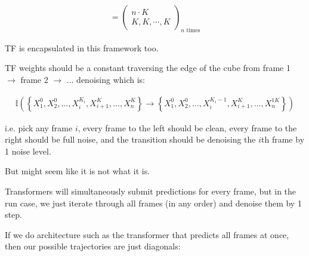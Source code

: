 \documentclass[11pt]{article}
\begin{document}
\begin{align}
= \begin{pmatrix}
n \cdot K \\
K, K, \cdots, K
\end{pmatrix}_{n \text{ times}}
\end{align}

TF is encapsulated in this framework too.

TF weights should be a constant traversing the edge of the cube from frame 1 $\rightarrow$ frame 2 $\rightarrow$ ... denoising which is:

\begin{align}
\mathbb{I}\left( \left\{ X_1^0, X_2^0, \ldots, X_i^{K_i}, X_{i+1}^K, \ldots, X_n^K \right\} \rightarrow \left\{ X_1^0, X_2^0, \ldots, X_i^{K_i-1}, X_{i+1}^K, \ldots, X_n^{1K} \right\} \right)
\end{align}

i.e. pick any frame $i$, every frame to the left should be clean, every frame to the right should be full noise, and the transition should be denoising the $i$th frame by 1 noise level.

But might seem like it is not what it is.

Transformers will simultaneously submit predictions for every frame, but in the run case, we just iterate through all frames (in any order) and denoise them by 1 step.

\begin{center}
\end{center}

If we do architecture such as the transformer that predicts all frames at once, then our possible trajectories are just diagonals:

\begin{center}
\end{center}
\end{document}
